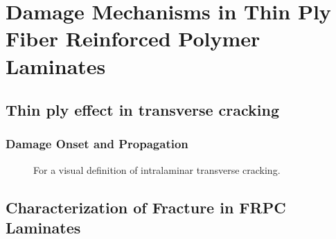 \documentclass[first,firstsupp,lastsupp,last,hyperref,table]{ETHclass}
\begin{document}
\section[Damage in Thin Ply FRPC]{Damage Mechanisms in Thin Ply Fiber Reinforced Polymer Laminates}

\subsection{Thin ply effect in transverse cracking}

\begin{frame}
\frametitle{\small Damage Onset and Propagation}
\vspace{-0.75cm}
\centering
\captionsetup[subfigure]{labelfont=footnotesize}
\begin{figure}[!h]
\centering
{}\quad
{}
 \caption{For a visual definition of intralaminar transverse cracking.}
  \label{fig:intralaminar-cracks}
\end{figure}
\end{frame}


\subsection[Characterization of Fracture in FRPC]{Characterization of Fracture in FRPC Laminates}
\end{document}
